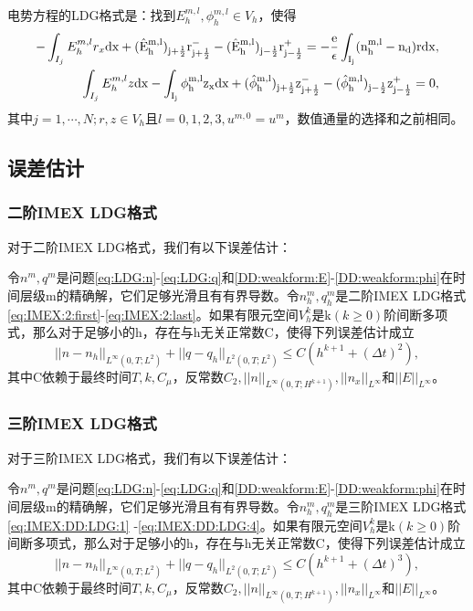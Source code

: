 电势方程的LDG格式是：找到$E_h^{m,l},\phi_h^{m,l} \in V_h$，使得
\begin{align}
    -\int_{I_j} E_h^{m,l}r_x \rm{d}x + (\hat{E}_h^{m,l})_{j+\frac{1}{2}}r_{j+\frac{1}{2}}^- - (\hat{E}_h^{m,l})_{j-\frac{1}{2}}r_{j-\frac{1}{2}}^+ = -\frac{e}{\epsilon}\int_{I_j}(n_h^{m,l} - n_d) r\rm{d} x, \label{eq:IMEX:poisson:LDG:1} \\
    \int_{I_j} E_h^{m,l}z \rm{d}x - \int_{I_j} \phi_h^{m,l}z_x \rm{d}x  + (\hat{\phi}_h^{m,l})_{j+\frac{1}{2}}z^-_{j+\frac{1}{2}} - (\hat{\phi}_h^{m,l})_{j-\frac{1}{2}}z_{j-\frac{1}{2}}^+  = 0,\label{eq:IMEX:poisson:LDG:2}
\end{align}
其中$j = 1,\cdots,N; r,z \in V_h$且$l = 0,1,2,3, u^{m,0} = u^m$，数值通量的选择和之前相同。

\subsection{误差估计}
\subsubsection{二阶IMEX LDG格式}
对于二阶IMEX LDG格式，我们有以下误差估计\cite{liu2016analysis}：
\begin{theorem}
    令$n^m,q^m$是问题\eqref{eq:LDG:n}-\eqref{eq:LDG:q}和\eqref{DD:weakform:E}-\eqref{DD:weakform:phi}在时间层级m的精确解，它们足够光滑且有有界导数。令$n_h^m,q_h^m$是二阶IMEX LDG格式\eqref{eq:IMEX:2:first}-\eqref{eq:IMEX:2:last}。如果有限元空间$V_h^k$是k$(k\geq  0)$阶间断多项式，那么对于足够小的h，存在与h无关正常数C，使得下列误差估计成立
    \begin{equation}
        ||n-n_h||_{L^{\infty}(0,T;L^2)} + ||q - q_h||_{L^2(0,T;L^2)} \leq C(h^{k+1} + (\Delta t)^2), \label{eq:IMEX:es:2}
    \end{equation}
    其中C依赖于最终时间$T,k,C_{\mu}$，反常数$C_2, ||n||_{L^{\infty}(0,T;H^{k+1})}, ||n_x||_{L^{\infty}}$和$||E||_{L^{\infty}}$。
\end{theorem}
\subsubsection{三阶IMEX LDG格式}
对于三阶IMEX LDG格式，我们有以下误差估计\cite{liu2016analysis}：
\begin{theorem}
    令$n^m,q^m$是问题\eqref{eq:LDG:n}-\eqref{eq:LDG:q}和\eqref{DD:weakform:E}-\eqref{DD:weakform:phi}在时间层级m的精确解，它们足够光滑且有有界导数。令$n_h^m,q_h^m$是三阶IMEX LDG格式\eqref{eq:IMEX:DD:LDG:1} -\eqref{eq:IMEX:DD:LDG:4}。如果有限元空间$V_h^k$是k$(k\geq  0)$阶间断多项式，那么对于足够小的h，存在与h无关正常数C，使得下列误差估计成立
    \begin{equation}
        ||n-n_h||_{L^{\infty}(0,T;L^2)} + ||q - q_h||_{L^2(0,T;L^2)} \leq C(h^{k+1} + (\Delta t)^3), \label{eq:IMEX:es:3}
    \end{equation}
    其中C依赖于最终时间$T,k,C_{\mu}$，反常数$C_2, ||n||_{L^{\infty}(0,T;H^{k+1})}, ||n_x||_{L^{\infty}}$和$||E||_{L^{\infty}}$。
\end{theorem}
